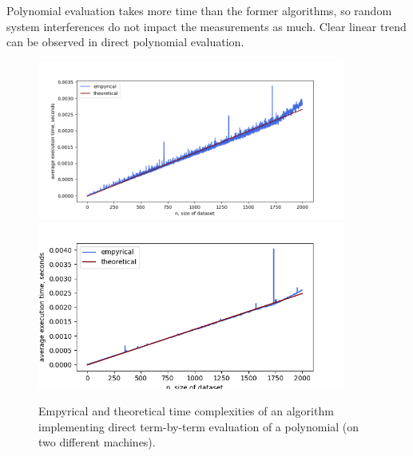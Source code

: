 \documentclass[12pt, a4paper]{article}
\begin{document}
Polynomial evaluation takes more time than the former algorithms, so random system interferences do not impact the measurements as much. Clear linear trend can be observed in direct polynomial evaluation.
\begin{figure}[!h]
\centering
\includegraphics[width=0.9\textwidth]{polydirect.png}
\includegraphics[width=0.9\textwidth]{valeria/polydirect.png}
\caption{Empyrical and theoretical time complexities of an algorithm implementing direct term-by-term evaluation of a polynomial (on two different machines).}
\end{figure}

\newpage
\end{document}
